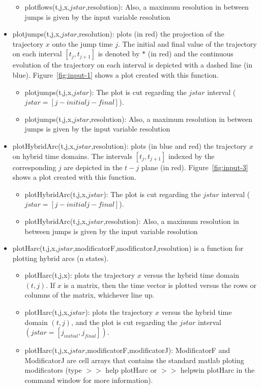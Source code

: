 \documentclass{article}
\begin{document}
\begin{itemize}
\begin{itemize}
	\item plotflows(t,j,x,$jstar$,resolution): Also, a maximum resolution in between jumps is given by the input variable resolution
 \end{itemize}
\item plotjumps(t,j,x,$jstar$,resolution): plots (in red) the projection of the
  trajectory $x$ onto the jump time $j$. The initial and final value
  of the trajectory on each interval $[t_j,t_{j+1}]$ is denoted by
  $*$ (in red) and the continuous evolution of the trajectory on
  each interval is depicted with a dashed line (in blue). Figure~\ref{fig:input-1} shows a plot created with this function.
 \begin{itemize}
 	\item plotjumps(t,j,x,$jstar$): The plot is cut regarding the $jstar$ interval ($jstar = [j-initial j-final]$).
	\item plotjumps(t,j,x,$jstar$,resolution): Also, a maximum resolution in between jumps is given by the input variable resolution
 \end{itemize}

\item plotHybridArc(t,j,x,$jstar$,resolution): plots (in blue and red) the trajectory $x$ on hybrid
time domains. The intervals $[t_j,t_{j+1}]$ indexed by the
corresponding $j$ are depicted in the $t-j$ plane (in red). Figure~\ref{fig:input-3} shows a plot created with this function.
 \begin{itemize}
 	\item plotHybridArc(t,j,x,$jstar$): The plot is cut regarding the $jstar$ interval ($jstar = [j-initial j-final]$).
	\item plotHybridArc(t,j,x,$jstar$,resolution): Also, a maximum resolution in between jumps is given by the input variable resolution
 \end{itemize}

\item plotHarc(t,j,x,$jstar$,modificatorF,modificatorJ,resolution) is a function for plotting hybrid arcs (n states).
\begin{itemize}
\item plotHarc(t,j,x): plots the trajectory $x$ versus the hybrid time domain $(t,j)$. If $x$ is a matrix, then the time vector is plotted versus the rows or columns of the matrix, whichever line up.
\item plotHarc(t,j,x,$jstar$): plots the trajectory $x$ versus the hybrid time domain $(t,j)$, and the plot is cut regarding the $jstar$ interval $(jstar = [j_{initial},j_{final}])$.
\item plotHarc(t,j,x,$jstar$,modificatorF,modificatorJ): ModificatorF and ModificatorJ are cell arrays that contains the standard matlab ploting modificators (type $>>$ help plotHarc or $>>$ helpwin plotHarc in the command window for more information).
\end{itemize}


\end{itemize}
\end{document}
